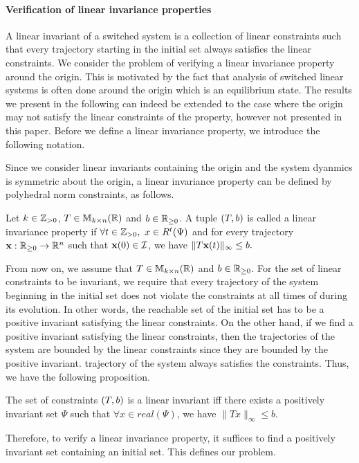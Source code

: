 \paragraph*{Verification of linear invariance properties}
A linear invariant of a switched system is a collection of linear
constraints such that every trajectory starting in the initial set
always satisfies the linear constraints. We consider the problem
of verifying a linear invariance property around the origin.  This is
motivated by the fact that analysis of switched linear systems is
often done around the origin which is an equilibrium state.  The
results we present in the following can indeed be extended to the case
where the origin may not satisfy the linear constraints of the
property, however not presented in this paper.  Before we define a
linear invariance property, we introduce the following notation.

Since we consider linear
invariants containing the origin and the system dyanmics is symmetric
about the origin, a linear invariance property can be defined by
polyhedral norm constraints, as follows.
%
\begin{defn}
Let $k\in\mathbb{Z}_{> 0}$, $T\in\mathbb{M}_{k\times n}(\mathbb{R})$ and $b\in\mathbb{R}_{\geq 0}$.  A tuple $\left(T,b\right)$ is called a linear invariance property if
$\forall t\in\mathbb{Z}_{> 0},~x\in R^t(\Psi)$ and for every trajectory
$\textbf{x}:\mathbb{R}_{\geq 0}\rightarrow\mathbb{R}^n$ such that $\textbf{x}(0)\in\mathcal{I}$, we have
$\|T\textbf{x}(t)\|_{\infty}\leq b.$
\end{defn}
%
From now on, we assume that $T\in\mathbb{M}_{k\times n}(\mathbb{R})$ and $b\in\mathbb{R}_{\geq 0}$.  For
the set of linear constraints to be invariant, we require that every
trajectory of the system beginning in the initial set does not violate
the constraints at all times of during its evolution.  In other words,
the reachable set of the initial set has to be a positive invariant
satisfying the linear constraints.  On the other hand, if we find a
positive invariant satisfying the linear constraints, then the
trajectories of the system are bounded by the linear constraints since
they are bounded by the positive invariant.  trajectory of the system
always satisfies the constraints.  Thus, we have the following
proposition.
%
\begin{prop}\label{prop:pi-li}
The set of constraints ${\left(T,b\right)}$ is a linear invariant iff there
exists a positively invariant set $\Psi$ such that $\forall x\in real(\Psi)$,
we have
$\|Tx\|_{\infty}\leq b$.
\end{prop}
%
Therefore, to verify a linear invariance property, it
suffices to find a positively invariant set containing an initial
set.  This defines our problem.

